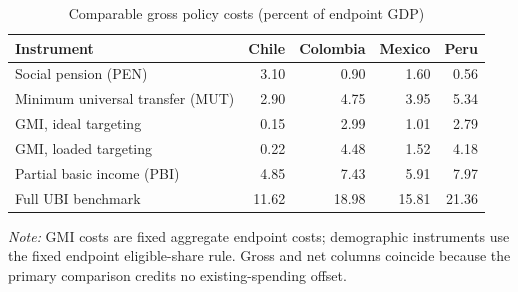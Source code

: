 \begin{table}[H]
\centering
\small
\begin{singlespace}
\caption{Comparable gross policy costs (percent of endpoint GDP)}
\label{tab:costs_results_clean}
\begin{tabular}{@{}lrrrr@{}}
\toprule
Instrument & Chile & Colombia & Mexico & Peru \\
\midrule
Social pension (PEN) & 3.10 & 0.90 & 1.60 & 0.56 \\
Minimum universal transfer (MUT) & 2.90 & 4.75 & 3.95 & 5.34 \\
GMI, ideal targeting & 0.15 & 2.99 & 1.01 & 2.79 \\
GMI, loaded targeting & 0.22 & 4.48 & 1.52 & 4.18 \\
Partial basic income (PBI) & 4.85 & 7.43 & 5.91 & 7.97 \\
Full UBI benchmark & 11.62 & 18.98 & 15.81 & 21.36 \\
\bottomrule
\end{tabular}
\begin{minipage}{0.94\textwidth}\footnotesize
\emph{Note:} GMI costs are fixed aggregate endpoint costs; demographic instruments use the fixed endpoint eligible-share rule. Gross and net columns coincide because the primary comparison credits no existing-spending offset.
\end{minipage}
\end{singlespace}
\end{table}
